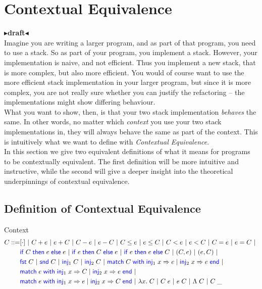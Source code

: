 \documentclass[twoside,11pt,openright]{report}
\theoremstyle{definition}
\newcommand{\BNFdef}{::=}
\newcommand{\ALT}{~|~}
\newcommand{\Keyword}[1]{{\color{blue} \mathsf{#1}}}
\newcommand{\var}{x}
\newcommand{\expr}{e}
\newcommand{\IfCmd}{\Keyword{if}}
\newcommand{\ThenCmd}{\Keyword{then}}
\newcommand{\ElseCmd}{\Keyword{else}}
\def\If#1then#2else#3{\IfCmd{}\;#1\;\ThenCmd{}\;#2\;\ElseCmd{}\;#3}
\newcommand{\Fst}{\Keyword{fst}\;}
\newcommand{\Snd}{\Keyword{snd}\;}
\newcommand{\Inj}[1]{\Keyword{inj}_{#1}\;}
\newcommand{\MatchCmd}{\Keyword{match}}
\newcommand{\WithCmd}{\Keyword{with}}
\newcommand{\EndCmd}{\Keyword{end}}
\def\Match#1with#2=>#3|#4=>#5end{\MatchCmd{}\;#1\;\WithCmd{}\;#2\Rightarrow#3 \;|\;#4\Rightarrow#5\;\EndCmd{}}
\newcommand{\Tlam}{\Lambda\;}
\newcommand{\Tapp}[1]{#1\;\_}
\newcommand{\empctx}{[\cdot]}
\newcommand{\ctx}{C}
\newcommand{\todo}[1]{{\color[rgb]{.5,0,0}\textbf{$\blacktriangleright$#1$\blacktriangleleft$}}}
\begin{document}
\chapter{Contextual Equivalence}
\label{ch:CE}

\todo{draft}\\
Imagine you are writing a larger program, and as part of that program, you need to use a stack. So as part of your program, you implement a stack. However, your implementation is naive, and not efficient. Thus you implement a new stack, that is more complex, but also more efficient. You would of course want to use the more efficient stack implementation in your larger program, but since it is more complex, you are not really sure whether you can justify the refactoring – the implementations might show differing behaviour.\\
What you want to show, then, is that your two stack implementation \textit{behaves} the same. In other words, no matter which \textit{context} you use your two stack implementations in, they will always behave the same as part of the context. This is intuitively what we want to define with \textit{Contextual Equivalence}.\\
In this section we give two equivalent definitions of what it means for programs to be contextually equivalent. The first definition will be more intuitive and instructive, while the second will give a deeper insight into the theoretical underpinnings of contextual equivalence.

\section{Definition of Contextual Equivalence}
Context
\begin{align*}
  \ctx \BNFdef& \empctx \ALT
                \ctx + \expr \ALT \expr + \ctx \ALT
                \ctx - \expr \ALT \expr - \ctx \ALT
                \ctx \le \expr \ALT \expr \le \ctx \ALT
                \ctx < \expr \ALT \expr < \ctx \ALT
                \ctx = \expr \ALT \expr = \ctx \ALT\\
              & {\If \ctx then \expr else \expr} \ALT
                {\If \expr then \ctx else \expr} \ALT
                {\If \expr then \expr else \ctx} \ALT
                (\ctx, \expr) \ALT (\expr, \ctx) \ALT\\
              & \Fst \ctx \ALT \Snd \ctx \ALT
                \Inj{1} \ctx \ALT \Inj{2} \ctx \ALT
                \Match \ctx with \Inj{1} \var => \expr | \Inj{2} \var => \expr end \ALT\\
              & \Match \expr with \Inj{1} \var => \ctx | \Inj{2} \var => \expr end \ALT\\
              & \Match \expr with \Inj{1} \var => \expr | \Inj{2} \var => \ctx end \ALT
              \fun \var . \ctx \ALT
              \ctx \; \expr \ALT \expr \; \ctx \ALT \Tlam \ctx \ALT \Tapp{\ctx}
\end{align*}
\end{document}
